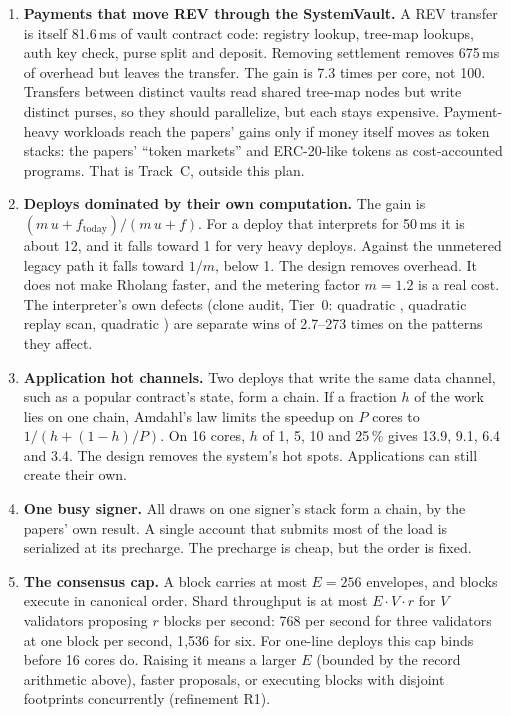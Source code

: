 \documentclass[11pt]{article}
\newcommand{\code}{\path}
\begin{document}
\begin{enumerate}
\item \textbf{Payments that move REV through the SystemVault.} A REV transfer is itself 81.6\,ms of vault contract code: registry lookup, tree-map lookups, auth key check, purse split and deposit. Removing settlement removes 675\,ms of overhead but leaves the transfer. The gain is 7.3 times per core, not 100. Transfers between distinct vaults read shared tree-map nodes but write distinct purses, so they should parallelize, but each stays expensive. Payment-heavy workloads reach the papers' gains only if money itself moves as token stacks: the papers' ``token markets'' and ERC-20-like tokens as cost-accounted programs. That is Track~C, outside this plan.
\item \textbf{Deploys dominated by their own computation.} The gain is $(m\,u + f_{\mathrm{today}})/(m\,u + f)$. For a deploy that interprets for 50\,ms it is about 12, and it falls toward 1 for very heavy deploys. Against the unmetered legacy path it falls toward $1/m$, below 1. The design removes overhead. It does not make Rholang faster, and the metering factor $m = 1.2$ is a real cost. The interpreter's own defects (clone audit, Tier~0: quadratic \code{Env::put}, quadratic replay scan, quadratic \code{eval_match}) are separate wins of 2.7--273 times on the patterns they affect.
\item \textbf{Application hot channels.} Two deploys that write the same data channel, such as a popular contract's state, form a chain. If a fraction $h$ of the work lies on one chain, Amdahl's law limits the speedup on $P$ cores to $1/(h + (1-h)/P)$. On 16 cores, $h$ of 1, 5, 10 and 25\,\% gives 13.9, 9.1, 6.4 and 3.4. The design removes the system's hot spots. Applications can still create their own.
\item \textbf{One busy signer.} All draws on one signer's stack form a chain, by the papers' own result. A single account that submits most of the load is serialized at its precharge. The precharge is cheap, but the order is fixed.
\item \textbf{The consensus cap.} A block carries at most $E = 256$ envelopes, and blocks execute in canonical order. Shard throughput is at most $E \cdot V \cdot r$ for $V$ validators proposing $r$ blocks per second: 768 per second for three validators at one block per second, 1{,}536 for six. For one-line deploys this cap binds before 16 cores do. Raising it means a larger $E$ (bounded by the record arithmetic above), faster proposals, or executing blocks with disjoint footprints concurrently (refinement R1).

\end{enumerate}
\end{document}
